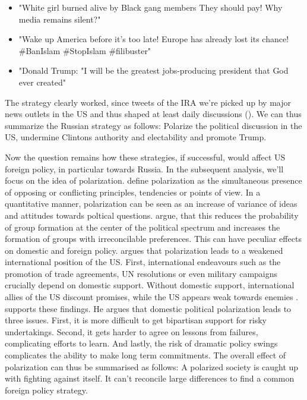 \documentclass[12pt, authoryear]{elsarticle}
\begin{document}
\begin{itemize}

\item "White girl burned alive by Black gang members  They should pay! Why media remains silent?"

\item "Wake up America before it's too late! Europe has already lost its chance!  \#BanIslam \#StopIslam \#filibuster"

\item "Donald Trump: "I will be the greatest jobs-producing president that God ever created"

\end{itemize}

The strategy clearly worked, since tweets of the IRA we're picked up by major news outlets in the US and thus shaped at least daily discussions (\cite{mueller2019report}). We can thus summarize the Russian strategy as follows: Polarize the political discussion in the US, undermine Clintons authority and electability and promote Trump.

Now the question remains how these strategies, if successful, would affect US foreign policy, in particular towards Russia. In the subsequent analysis, we'll focus on the idea of polarization. \cite{fiorina2008political} define polarization as the simultaneous presence of opposing or conflicting principles, tendencies or points of view. In a quantitative manner, polarization can be seen as an increase of variance of ideas and attitudes towards poltical questions. \cite{dimaggio1996have} argue, that this reduces the probability of group formation at the center of the political spectrum and increases the formation of groups with irreconcilable preferences. This can have peculiar effects on domestic and foreign policy. \cite{beinart2008politics} argues that polarization leads to a weakened international position of the US. First, international endeavours such as the promotion of trade agreements, UN resolutions or even military campaigns crucially depend on domestic support. Without domestic support, international allies of the US discount promises, while the US appears weak towards enemies \citep{beinart2008politics}. \cite{schultz2017perils} supports these findings. He argues that domestic political polarization leads to three issues. First, it is more difficult to get bipartisan support for risky undertakings. Second, it gets harder to agree on lessons from failures, complicating efforts to learn. And lastly, the risk of dramatic policy swings complicates the ability to make long term commitments. The overall effect of polarization can thus be summarised as follows: A polarized society is caught up with fighting against itself. It can't
reconcile large differences to find a common foreign policy strategy.
\end{document}
